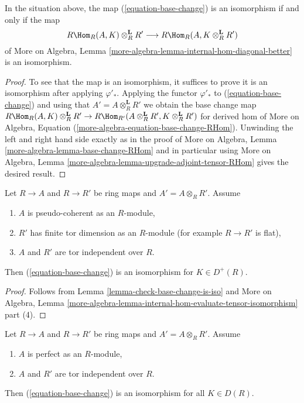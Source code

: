 \begin{lemma}
\label{lemma-check-base-change-is-iso}
In the situation above, the map (\ref{equation-base-change})
is an isomorphism if and only if the map
$$
R\Hom_R(A, K) \otimes_R^\mathbf{L} R'
\longrightarrow
R\Hom_R(A, K \otimes_R^\mathbf{L} R')
$$
of More on Algebra, Lemma
\ref{more-algebra-lemma-internal-hom-diagonal-better} is an isomorphism.
\end{lemma}

\begin{proof}
To see that the map is an isomorphism, it suffices to prove it
is an isomorphism after applying $\varphi'_*$.
Applying the functor $\varphi'_*$ to (\ref{equation-base-change})
and using that $A' = A \otimes_R^\mathbf{L} R'$
we obtain the base change map
$R\Hom_R(A, K) \otimes_R^\mathbf{L} R' \to
R\Hom_{R'}(A \otimes_R^\mathbf{L} R', K \otimes_R^\mathbf{L} R')$
for derived hom of
More on Algebra, Equation (\ref{more-algebra-equation-base-change-RHom}).
Unwinding the left and right hand side exactly as in the proof of
More on Algebra, Lemma \ref{more-algebra-lemma-base-change-RHom}
and in particular using
More on Algebra, Lemma \ref{more-algebra-lemma-upgrade-adjoint-tensor-RHom}
gives the desired result.
\end{proof}

\begin{lemma}
\label{lemma-flat-bc-surjection}
Let $R \to A$ and $R \to R'$ be ring maps and $A' = A \otimes_R R'$.
Assume
\begin{enumerate}
\item $A$ is pseudo-coherent as an $R$-module,
\item $R'$ has finite tor dimension as an $R$-module (for example
$R \to R'$ is flat),
\item $A$ and $R'$ are tor independent over $R$.
\end{enumerate}
Then (\ref{equation-base-change}) is an isomorphism for $K \in D^+(R)$.
\end{lemma}

\begin{proof}
Follows from Lemma \ref{lemma-check-base-change-is-iso} and
More on Algebra, Lemma
\ref{more-algebra-lemma-internal-hom-evaluate-tensor-isomorphism} part (4).
\end{proof}

\begin{lemma}
\label{lemma-bc-surjection}
Let $R \to A$ and $R \to R'$ be ring maps and $A' = A \otimes_R R'$.
Assume
\begin{enumerate}
\item $A$ is perfect as an $R$-module,
\item $A$ and $R'$ are tor independent over $R$.
\end{enumerate}
Then (\ref{equation-base-change}) is an isomorphism for all $K \in D(R)$.
\end{lemma}

